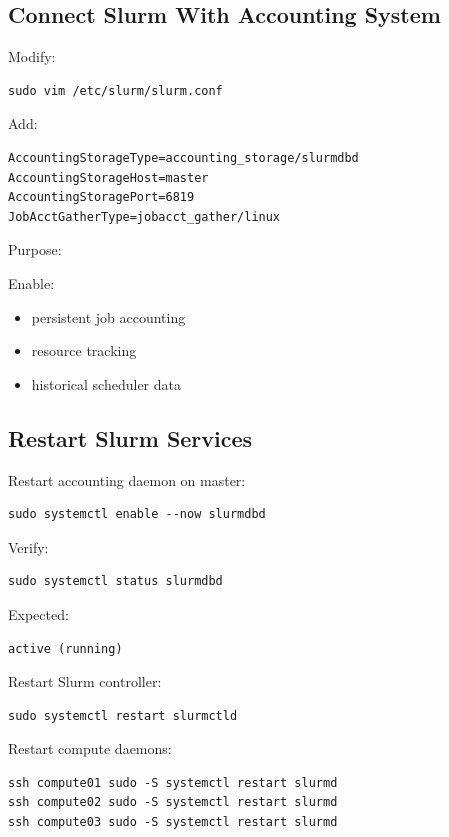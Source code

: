 \documentclass[11pt]{article}
\begin{document}
\subsection{Connect Slurm With Accounting System}
\label{sec:org00761b1}

Modify:

\begin{verbatim}
sudo vim /etc/slurm/slurm.conf
\end{verbatim}

Add:

\begin{verbatim}
AccountingStorageType=accounting_storage/slurmdbd
AccountingStorageHost=master
AccountingStoragePort=6819
JobAcctGatherType=jobacct_gather/linux
\end{verbatim}

Purpose:

Enable:

\begin{itemize}
\item persistent job accounting
\item resource tracking
\item historical scheduler data
\end{itemize}
\subsection{Restart Slurm Services}
\label{sec:org803b5d7}

Restart accounting daemon on master:

\begin{verbatim}
sudo systemctl enable --now slurmdbd
\end{verbatim}

Verify:

\begin{verbatim}
sudo systemctl status slurmdbd
\end{verbatim}

Expected:

\begin{verbatim}
active (running)
\end{verbatim}

Restart Slurm controller:

\begin{verbatim}
sudo systemctl restart slurmctld
\end{verbatim}

Restart compute daemons:

\begin{verbatim}
ssh compute01 sudo -S systemctl restart slurmd
ssh compute02 sudo -S systemctl restart slurmd
ssh compute03 sudo -S systemctl restart slurmd
\end{verbatim}
\end{document}
